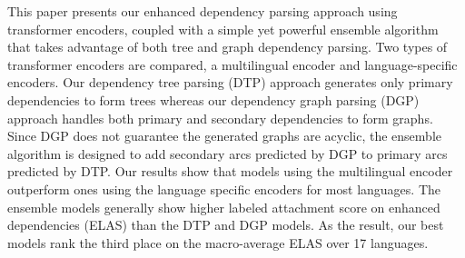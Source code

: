 This paper presents our enhanced dependency parsing approach using transformer encoders, coupled with a simple yet powerful ensemble algorithm that takes advantage of both tree and graph dependency parsing. Two types of transformer encoders are compared, a multilingual encoder and language-specific encoders. Our dependency tree parsing (DTP) approach generates only primary dependencies to form trees whereas our dependency graph parsing (DGP) approach handles both primary and secondary dependencies to form graphs. Since DGP does not guarantee the generated graphs are acyclic, the ensemble algorithm is designed to add secondary arcs predicted by DGP to primary arcs predicted by DTP. Our results show that models using the multilingual encoder outperform ones using the language specific encoders for most languages. The ensemble models generally show higher labeled attachment score on enhanced dependencies (ELAS) than the DTP and DGP models. As the result, our best models rank the third place on the macro-average ELAS over 17 languages.
